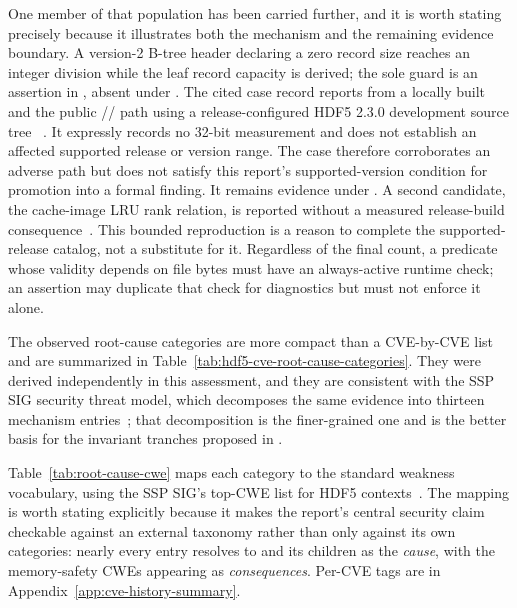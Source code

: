 \documentclass[../main.tex]{subfiles}
\begin{document}
One member of that population has been carried further, and it is worth stating
precisely because it illustrates both the mechanism and the remaining evidence
boundary. A version-2 B-tree header declaring a zero record size reaches an
integer division while the leaf record capacity is derived; the sole guard is
an assertion in , absent under . The cited case
record reports  from a locally built  and the
public // path using a
release-configured HDF5 2.3.0 development source tree
~\cite{h5policy-case-v2btree-recordsize}. It expressly records no 32-bit
measurement and does not establish an affected supported release or version
range. The case therefore corroborates an adverse  path but
does not satisfy this report's supported-version condition for promotion into
a formal finding. It remains evidence under . A second
candidate, the cache-image LRU rank relation, is reported without a measured
release-build consequence~\cite{h5policy-case-mdci-lru}. This bounded
reproduction is a reason to complete the supported-release catalog, not a
substitute for it.
Regardless of the final count, a predicate whose validity depends on file bytes
must have an always-active runtime check; an assertion may duplicate that check
for diagnostics but must not enforce it alone.

The observed root-cause categories are more compact than a CVE-by-CVE list and
are summarized in Table~\ref{tab:hdf5-cve-root-cause-categories}. They were
derived independently in this assessment, and they are consistent with the SSP
SIG security threat model, which decomposes the same evidence into thirteen
mechanism entries~\cite{hdf5-security-threat-model,hdf5-ssp-atk}; that
decomposition is the finer-grained one and is the better basis for the
invariant tranches proposed in .

Table~\ref{tab:root-cause-cwe} maps each category to the standard weakness
vocabulary, using the SSP SIG's top-CWE list for HDF5
contexts~\cite{hdf5-top-cwe}. The mapping is worth stating explicitly because
it makes the report's central security claim checkable against an external
taxonomy rather than only against its own categories: nearly every entry
resolves to  and its children as the \emph{cause}, with the
memory-safety CWEs appearing as \emph{consequences}. Per-CVE tags are in
Appendix~\ref{app:cve-history-summary}.

\begingroup
\small
\setlength{\tabcolsep}{3pt}
\renewcommand{\arraystretch}{1.15}
\end{document}
